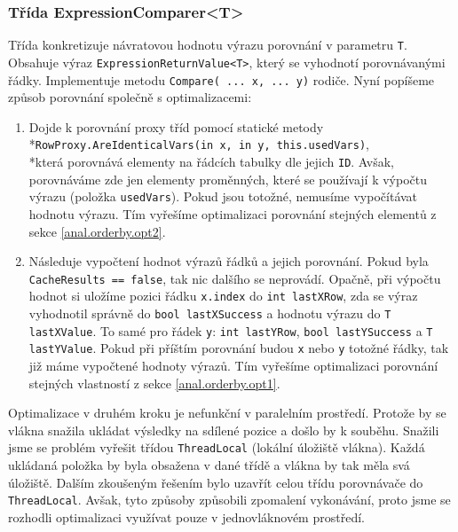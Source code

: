 \subsubsection{Třída ExpressionComparer<T>} \label{impl.orderby.opts}

Třída konkretizuje návratovou hodnotu výrazu porovnání v parametru \texttt{T}.
Obsahuje výraz \texttt{ExpressionReturnValue<T>}, který se vyhodnotí porovnávanými řádky.
Implementuje metodu \texttt{Compare( ... x, ... y)} rodiče.
Nyní popíšeme způsob porovnání společně s optimalizacemi:

\begin{enumerate}
\item Dojde k porovnání proxy tříd pomocí statické metody \\*\texttt{RowProxy.AreIdenticalVars(in x, in y, this.usedVars)}, \\*která
porovnává elementy na řádcích tabulky dle jejich \texttt{ID}.
Avšak, porovnáváme zde jen elementy proměnných, které se používají k výpočtu výrazu (položka \texttt{usedVars}).
Pokud jsou totožné, nemusíme vypočítávat hodnotu výrazu.
Tím vyřešíme optimalizaci porovnání stejných elementů z sekce \ref{anal.orderby.opt2}.

\item Následuje vypočtení hodnot výrazů řádků a jejich porovnání.
Pokud byla \texttt{CacheResults == false}, tak nic dalšího se neprovádí.
Opačně, při výpočtu hodnot si uložíme pozici řádku \texttt{x.index} do \texttt{int lastXRow}, zda se výraz vyhodnotil správně do \texttt{bool lastXSuccess} a hodnotu výrazu do \texttt{T lastXValue}.
To samé pro řádek \texttt{y}: \texttt{int lastYRow}, \texttt{bool lastYSuccess} a \texttt{T lastYValue}.
Pokud při příštím porovnání budou \texttt{x} nebo \texttt{y} totožné řádky, tak již máme vypočtené hodnoty výrazů. 
Tím vyřešíme optimalizaci porovnání stejných vlastností z sekce \ref{anal.orderby.opt1}.
\end{enumerate}

Optimalizace v druhém kroku je nefunkční v paralelním prostředí.
Protože by se vlákna snažila ukládat výsledky na sdílené pozice a došlo by k souběhu.
Snažili jsme se problém vyřešit třídou \texttt{ThreadLocal} (lokální úložiště vlákna).
Každá ukládaná položka by byla obsažena v dané třídě a vlákna by tak měla svá úložiště.
Dalším zkoušeným řešením bylo uzavřít celou třídu porovnávače do \texttt{ThreadLocal}.
Avšak, tyto způsoby způsobili zpomalení vykonávání, proto jsme se rozhodli optimalizaci využívat pouze v jednovláknovém prostředí.

